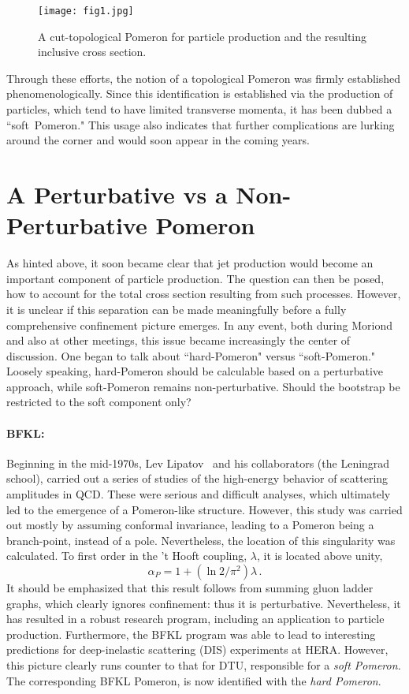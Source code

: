 \documentclass[11pt, oneside]{article}   	%
\newcommand{\<}{\langle}
\renewcommand{\>}{\rangle}
\numberwithin{equation}{section}
\numberwithin{figure}{section}
\begin{document}
\vspace{-1mm}

\begin{figure}[ht]
\centering
\texttt{[image: fig1.jpg]}
\caption{A cut-topological Pomeron for particle production and the resulting inclusive cross section.}
\label{fig:delta-j}
\end{figure}


\noindent Through these efforts, the notion of a topological Pomeron was firmly established phenomenologically. Since this identification is established via the production of particles, which tend to have limited transverse momenta, it has been dubbed a \mbox{``soft Pomeron."} This usage also indicates that further complications are lurking around the corner and would soon appear in the coming years. 



\section{A Perturbative  vs a Non-Perturbative Pomeron}

As  hinted above, it soon became  clear that jet production would  become an important component of particle production. The question can then be posed, how to  account for the total cross section resulting from such processes. However, it is unclear if this separation can be made meaningfully before a fully comprehensive confinement picture emerges. In any event, both during Moriond and also at other meetings,  this issue became increasingly the center of discussion. One began to talk about ``hard-Pomeron" versus ``soft-Pomeron." Loosely speaking, hard-Pomeron should be calculable based on a perturbative approach, while soft-Pomeron remains non-perturbative. Should the bootstrap be restricted to the soft component only?

\paragraph{BFKL:}
Beginning in the mid-1970s, Lev Lipatov~\cite{Lipatov} and his collaborators (the Leningrad school),  carried out  a series of studies of the high-energy behavior of scattering amplitudes in QCD. These were serious and difficult analyses, which ultimately led to the emergence of a Pomeron-like structure. However, this study was carried out mostly by assuming conformal invariance, leading to a Pomeron being a branch-point, instead of a pole. Nevertheless, the location of this singularity was calculated. To first order in 
the 't Hooft  coupling, $\lambda$, it is located above unity, 
$$
\alpha_P= 1 + (\ln 2/\pi^2) \lambda \,.
$$
It should be emphasized that this result follows from summing gluon ladder graphs, which clearly ignores confinement: thus it is perturbative.  Nevertheless, it has resulted in a robust research program, including an application to particle production. Furthermore, the BFKL program was able to lead to interesting predictions for deep-inelastic scattering (DIS) experiments at HERA.  
 However, this picture clearly runs counter to that for DTU, responsible for a {\it soft Pomeron.} The corresponding BFKL Pomeron, is now identified with  the {\it hard Pomeron}.
\end{document}
